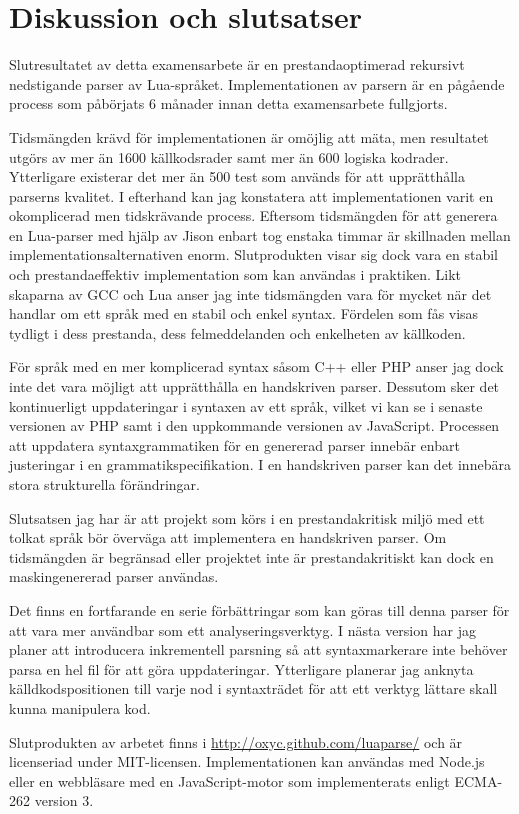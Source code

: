 \section{Diskussion och slutsatser}

Slutresultatet av detta examensarbete är en prestandaoptimerad rekursivt
nedstigande parser av Lua-språket. Implementationen av parsern är en pågående
process som påbörjats 6 månader innan detta examensarbete fullgjorts.

Tidsmängden krävd för implementationen är omöjlig att mäta, men resultatet
utgörs av mer än 1600 källkodsrader samt mer än 600 logiska kodrader.
Ytterligare existerar det mer än 500 test som används för att upprätthålla
parserns kvalitet. I efterhand kan jag konstatera att implementationen varit
en okomplicerad men tidskrävande process. Eftersom tidsmängden för att
generera en Lua-parser med hjälp av Jison enbart tog enstaka timmar är
skillnaden mellan implementationsalternativen enorm. Slutprodukten visar sig
dock vara en stabil och prestandaeffektiv implementation som kan användas i
praktiken. Likt skaparna av GCC och Lua anser jag inte tidsmängden vara för
mycket när det handlar om ett språk med en stabil och enkel syntax. Fördelen
som fås visas tydligt i dess prestanda, dess felmeddelanden och enkelheten av
källkoden.

För språk med en mer komplicerad syntax såsom C++ eller PHP anser jag dock
inte det vara möjligt att upprätthålla en handskriven parser. Dessutom sker
det kontinuerligt uppdateringar i syntaxen av ett språk, vilket vi kan se i
senaste versionen av PHP samt i den uppkommande versionen av JavaScript.
Processen att uppdatera syntaxgrammatiken för en genererad parser innebär
enbart justeringar i en grammatikspecifikation. I en handskriven parser kan
det innebära stora strukturella förändringar.

Slutsatsen jag har är att projekt som körs i en prestandakritisk miljö med ett
tolkat språk bör överväga att implementera en handskriven parser. Om
tidsmängden är begränsad eller projektet inte är prestandakritiskt kan dock en
maskingenererad parser användas.

Det finns en fortfarande en serie förbättringar som kan göras till denna
parser för att vara mer användbar som ett analyseringsverktyg. I nästa version
har jag planer att introducera inkrementell parsning så att syntaxmarkerare
inte behöver parsa en hel fil för att göra uppdateringar. Ytterligare planerar
jag anknyta källdkodspositionen till varje nod i syntaxträdet för att ett
verktyg lättare skall kunna manipulera kod.

Slutprodukten av arbetet finns i \url{http://oxyc.github.com/luaparse/} och är
licenseriad under MIT-licensen. Implementationen kan användas med Node.js
eller en webbläsare med en JavaScript-motor som implementerats enligt ECMA-262
version 3.

